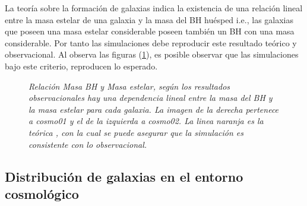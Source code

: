 La teoría sobre la formación de galaxias indica la existencia de una relación lineal entre la masa estelar de una galaxia y la masa del BH huésped \cite{marconi2003} i.e., las galaxias que poseen una masa estelar considerable poseen también un BH con una masa considerable. Por tanto las simulaciones debe reproducir este resultado teórico y observacional. Al observa las figuras (\ref{fig: Mass_bhVsMass_stelar}), es posible observar que las simulaciones bajo este criterio, reproducen lo esperado. 
%
 \begin{figure}
 \centering
 \caption[Relación Masa BH y Masa estelar]{\emph{Relación Masa BH y Masa estelar, según los resultados observacionales hay una dependencia lineal entre la masa del BH y la masa estelar para cada galaxia. La imagen de la derecha pertenece a {\it{cosmo01}} y el de la izquierda a {\it{cosmo02}}. La linea naranja es la teórica \cite{McConnell2013}, con la cual se puede asegurar que la simulación es consistente con lo observacional.}}
 \label{fig: Mass_bhVsMass_stelar}
\end{figure}
%
    \subsection{ Distribución de galaxias en el entorno cosmológico}
    \label{subsec: Distribucion de galaxias}

